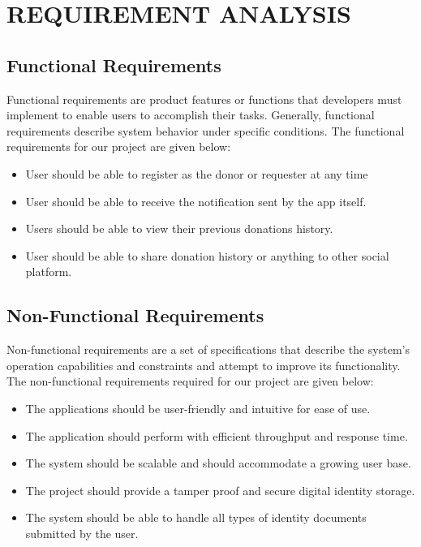 \chapter{REQUIREMENT ANALYSIS}
\section{Functional Requirements}
Functional requirements are product features or functions that developers must implement to enable users to accomplish their tasks. Generally, functional requirements describe system behavior under specific conditions. The functional requirements for our project are given below:
\begin{itemize}[itemsep=-4pt, topsep=-8pt]
    \item User should be able to register as the donor or requester at any time
    \item User should be able to receive the notification sent by the app itself.
    \item Users should be able to view their previous donations history.
    \item User should be able to share donation history or anything to other social platform.
\end{itemize}

\section{Non-Functional Requirements}
Non-functional requirements are a set of specifications that describe the system's operation capabilities and constraints and attempt to improve its functionality. The non-functional requirements required for our project are given below:
\begin{itemize}[itemsep=-4pt, topsep=-8pt]
\item The applications should be user-friendly and intuitive for ease of use. 
\item The application should perform with efficient throughput and response time.
\item The system should be scalable and should accommodate a growing user base.
\item The project should provide a tamper proof and secure digital identity storage.
\item The system should be able to handle all types of identity documents submitted by the user.

\end{itemize}


